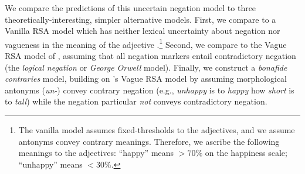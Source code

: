 \documentclass[floatsintext,doc]{apa6}
\let\rmarkdownfootnote\footnote%
\def\footnote{\protect\rmarkdownfootnote}
\begin{document}




We compare the predictions of this uncertain negation model to three theoretically-interesting, simpler alternative models.
First, we compare to a Vanilla RSA model which has neither lexical uncertainty about negation nor vagueness in the meaning of the adjective \cite{Frank2012}.\footnote{
The vanilla model assumes fixed-thresholds to the adjectives, and we assume antonyms convey contrary meanings. Therefore, we ascribe the following meanings to the adjectives: \enquote{happy} means \(>70\%\) on the happiness scale; \enquote{unhappy} means \(<30\%\).
}
Second, we compare to the Vague RSA model of , assuming that all negation markers entail contradictory negation (the \emph{logical negation} or \emph{George Orwell} model).
Finally, we construct a \emph{bonafide contraries} model, building on 's Vague RSA model by assuming morphological antonyms (\emph{un-}) convey contrary negation (e.g., \emph{unhappy} is to \emph{happy} how \emph{short} is to \emph{tall}) while the negation particular \emph{not} conveys contradictory negation.
\end{document}
